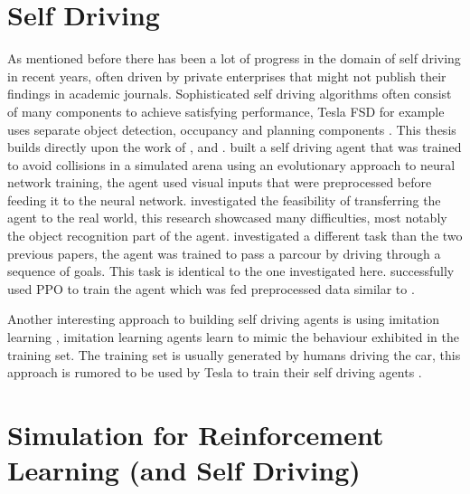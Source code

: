 \section{Self Driving}

As mentioned before there has been a lot of progress in the domain of self driving in recent years, often driven by private enterprises that might not publish their findings in academic journals. Sophisticated self driving algorithms often consist of many components to achieve satisfying performance, Tesla FSD for example uses separate object detection, occupancy and planning components \autocite{teslaEndToEnd}.
This thesis builds directly upon the work of \autocite{jonas_koenig}, \autocite{merlin_flach} and \autocite{maximilian}. \autocite{jonas_koenig} built a self driving agent that was trained to avoid collisions in a simulated arena using an evolutionary approach to neural network training, the agent used visual inputs that were preprocessed before feeding it to the neural network. \autocite{merlin_flach} investigated the feasibility of transferring the agent to the real world, this research showcased many difficulties, most notably the object recognition part of the agent. \autocite{maximilian} investigated a different task than the two previous papers, the agent was trained to pass a parcour by driving through a sequence of goals. This task is identical to the one investigated here. \autocite{maximilian} successfully used PPO to train the agent which was fed preprocessed data similar to \autocite{jonas_koenig}.

Another interesting approach to building self driving agents is using imitation learning \autocite{imitation_learning}, imitation learning agents learn to mimic the behaviour exhibited in the training set. The training set is usually generated by humans driving the car, this approach is rumored to be used by Tesla to train their self driving agents \autocite{teslaEndToEnd}.









\section{Simulation for Reinforcement Learning (and Self Driving)}


